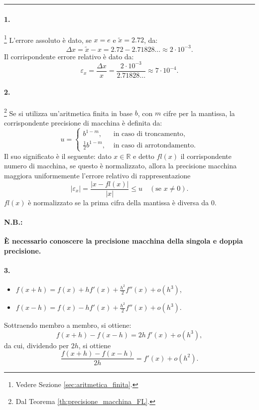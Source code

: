 \hrule

\paragraph{1.}\footnote{Vedere Sezione \ref{sec:aritmetica_finita}.} L'errore assoluto è dato, se $x=e$ e $\tilde x=2.72$, da:
\begin{equation*}
	\Delta x=\tilde x - x = 2.72 - 2.71828\hdots \approx 2\cdot 10^{-3}.
\end{equation*}
Il corrispondente errore relativo è dato da:
\begin{equation*}
	\varepsilon_x = \frac{\Delta x}{x} = \frac{2 \cdot10^{-3}}{2.71828\hdots}\approx 7\cdot 10^{-4}.
\end{equation*}

\paragraph{2.} \footnote{Dal Teorema \ref{th:precisione_macchina_FL}.} Se si utilizza un'aritmetica finita in base $b$, con $m$ cifre per la mantissa, la corrispondente precisione di macchina è definita da:
\begin{equation*}
	u=
	\begin{cases}
		b^{1-m}, &\text{ in caso di troncamento},\\
		\frac{1}{2}b^{1-m}, &\text{ in caso di arrotondamento}.
	\end{cases}
\end{equation*}
Il suo significato è il seguente: dato $x\in\mathbb R$ e detto $fl(x)$ il corrispondente numero di macchina, se questo è normalizzato, allora la precisione macchina \gls{maggiora uniformemente} l'errore relativo di rappresentazione
\begin{equation*}
	|\varepsilon_x| = \frac{|x-fl(x)|}{|x|}\leq u\quad (\text{se } x\neq 0).
\end{equation*}
$fl(x)$ è normalizzato se la prima cifra della mantissa è diversa da 0.

\paragraph{N.B.:} \textbf{È necessario conoscere la precisione macchina della singola e doppia precisione.}

\paragraph{3.}
\begin{itemize}
	\item $f(x+h)=f(x)+hf'(x)+\frac{h^2}{2}f''(x)+o(h^3)$,
	\item $f(x-h)=f(x)-hf'(x)+\frac{h^2}{2}f''(x)+o(h^3)$.
\end{itemize}
Sottraendo membro a membro, si ottiene:
\begin{equation*}
	f(x+h)-f(x-h)=2h\,f'(x)+o(h^3),
\end{equation*}
da cui, dividendo per $2h$, si ottiene
\begin{equation*}
	\frac{f(x+h)-f(x-h)}{2h}=f'(x)+o(h^2).
\end{equation*}

